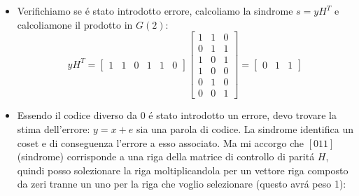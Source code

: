 \begin{enumerate}
{                    \begin{itemize}
                        \item {Verifichiamo se é stato introdotto errore, calcoliamo la sindrome $s = yH^T$ e calcoliamone il prodotto in $G(2)$:
                        \[
                            yH^T=
                                \begin{bmatrix}
                                1 & 1 & 0 & 1 & 1 & 0
                                \end{bmatrix}
                                \begin{bmatrix}
                                1 & 1 & 0 \\ 
                                0 & 1 & 1 \\ 
                                1 & 0 & 1 \\ 
                                1 & 0 & 0 \\
                                0 & 1 & 0 \\
                                0 & 0 & 1 
                                \end{bmatrix} =
                                    \begin{bmatrix}
                                    0 & 1 & 1 
                                    \end{bmatrix}   
                        \]
                        }
                        \item {Essendo il codice diverso da $0$ é stato introdotto un errore, devo trovare la stima dell'errore: $y=x+e$ sia una parola di codice. 
                            La sindrome identifica un coset e di conseguenza l'errore a esso associato. Ma mi accorgo che $[011]$ (sindrome) corrisponde a una riga della matrice di controllo di paritá $H$, quindi posso solezionare la riga moltiplicandola per un vettore 
                            riga composto da zeri tranne un uno per la riga che voglio selezionare (questo avrá peso 1):
                            
}
\end{itemize}}
\end{enumerate}
